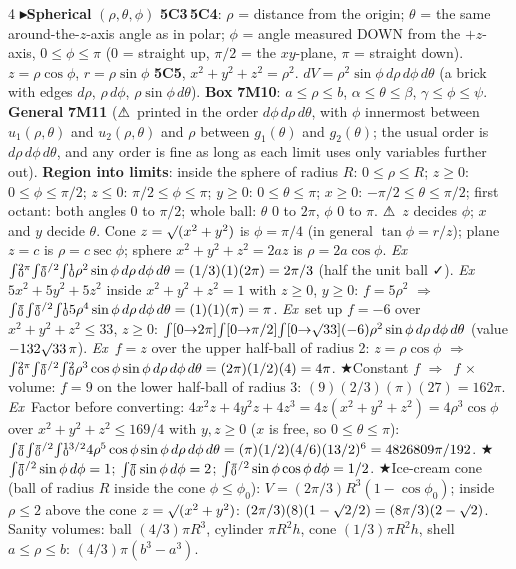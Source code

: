\documentclass{article}
\newcommand\supy[1]{\sp{\smash{\lower0.02em\hbox{$\scriptstyle#1$}}}}    %
\newcommand\suby[1]{\sb{\smash{\raise0.10em\hbox{$\scriptstyle#1$}}}}    %
\newcommand\I[2]{{\smash{\int}}\suby{#1}\supy{#2}}                        %
\newcommand\Ia[2]{{\smash{\int}}[#1{\to}#2]}                              %
\newcommand\sh[1]{{\setlength\fboxsep{0.18pt}\colorbox{black!22}{\textbf{#1}}}}  %
\newcommand\pt[1]{\textbf{{\symf ▸}#1}}       %
\newcommand\ex{\textit{Ex}\ }                  %
\newcommand\warn{{\symf ⚠}}                    %
\newcommand\shc{{\symf ★}}                      %
\newcommand\ok{{\symf ✓}}                       %
\newcommand\rt{\smash{\surd}}                  %
\newcommand\then{\ensuremath{\Rightarrow}}
\begin{document}
\begin{multicols*}{4}
\pt{Spherical} $(\rho,\theta,\phi)$ \sh{5C3}\,\sh{5C4}: $\rho$ = distance from the origin; $\theta$ = the same around-the-$z$-axis angle as in polar; $\phi$ = angle measured DOWN from the $+z$-axis, $0\le\phi\le\pi$ (0 = straight up, $\pi/2$ = the $xy$-plane, $\pi$ = straight down). $z=\rho\cos\phi$, $r=\rho\sin\phi$ \sh{5C5}, $x^2+y^2+z^2=\rho^2$. $dV=\rho^2\sin\phi\,d\rho\,d\phi\,d\theta$ (a brick with edges $d\rho$, $\rho\,d\phi$, $\rho\sin\phi\,d\theta$). \textbf{Box} \sh{7M10}: $a\le\rho\le b$, $\alpha\le\theta\le\beta$, $\gamma\le\phi\le\psi$. \textbf{General} \sh{7M11} (\warn\ printed in the order $d\phi\,d\rho\,d\theta$, with $\phi$ innermost between $u_1(\rho,\theta)$ and $u_2(\rho,\theta)$ and $\rho$ between $g_1(\theta)$ and $g_2(\theta)$; the usual order is $d\rho\,d\phi\,d\theta$, and any order is fine as long as each limit uses only variables further out). \textbf{Region into limits}: inside the sphere of radius $R$: $0\le\rho\le R$; $z\ge0$: $0\le\phi\le\pi/2$; $z\le0$: $\pi/2\le\phi\le\pi$; $y\ge0$: $0\le\theta\le\pi$; $x\ge0$: $-\pi/2\le\theta\le\pi/2$; first octant: both angles $0$ to $\pi/2$; whole ball: $\theta$ $0$ to $2\pi$, $\phi$ $0$ to $\pi$. \warn\ $z$ decides $\phi$; $x$ and $y$ decide $\theta$. Cone $z=\rt(x^2+y^2)$ is $\phi=\pi/4$ (in general $\tan\phi=r/z$); plane $z=c$ is $\rho=c\sec\phi$; sphere $x^2+y^2+z^2=2az$ is $\rho=2a\cos\phi$. \ex $\I{0}{2\pi}\I{0}{\pi/2}\I{0}{1}\rho^2\sin\phi\,d\rho\,d\phi\,d\theta=(1/3)(1)(2\pi)=2\pi/3$ (half the unit ball \ok). \ex $5x^2+5y^2+5z^2$ inside $x^2+y^2+z^2=1$ with $z\ge0$, $y\ge0$: $f=5\rho^2$ \then\ $\I{0}{\pi}\I{0}{\pi/2}\I{0}{1}5\rho^4\sin\phi\,d\rho\,d\phi\,d\theta=(1)(1)(\pi)=\pi$. \ex set up $f=-6$ over $x^2+y^2+z^2\le33$, $z\ge0$: $\Ia{0}{2\pi}\Ia{0}{\pi/2}\Ia{0}{\rt33}(-6)\rho^2\sin\phi\,d\rho\,d\phi\,d\theta$ (value $-132\rt33\,\pi$). \ex $f=z$ over the upper half-ball of radius 2: $z=\rho\cos\phi$ \then\ $\I{0}{2\pi}\I{0}{\pi/2}\I{0}{2}\rho^3\cos\phi\sin\phi\,d\rho\,d\phi\,d\theta=(2\pi)(1/2)(4)=4\pi$. \shc Constant $f$ \then\ $f$ × volume: $f=9$ on the lower half-ball of radius 3: $(9)(2/3)(\pi)(27)=162\pi$. \ex Factor before converting: $4x^2z+4y^2z+4z^3=4z(x^2+y^2+z^2)=4\rho^3\cos\phi$ over $x^2+y^2+z^2\le169/4$ with $y,z\ge0$ ($x$ is free, so $0\le\theta\le\pi$): $\I{0}{\pi}\I{0}{\pi/2}\I{0}{13/2}4\rho^5\cos\phi\sin\phi\,d\rho\,d\phi\,d\theta=(\pi)(1/2)(4/6)(13/2)^6=4826809\pi/192$. \shc $\I{0}{\pi/2}\sin\phi\,d\phi=1$; $\I{0}{\pi}\sin\phi\,d\phi=2$; $\I{0}{\pi/2}\sin\phi\cos\phi\,d\phi=1/2$. \shc Ice-cream cone (ball of radius $R$ inside the cone $\phi\le\phi_0$): $V=(2\pi/3)R^3(1-\cos\phi_0)$; inside $\rho\le2$ above the cone $z=\rt(x^2+y^2)$: $(2\pi/3)(8)(1-\rt2/2)=(8\pi/3)(2-\rt2)$. Sanity volumes: ball $(4/3)\pi R^3$, cylinder $\pi R^2h$, cone $(1/3)\pi R^2h$, shell $a\le\rho\le b$: $(4/3)\pi(b^3-a^3)$.


\end{multicols*}
\end{document}
